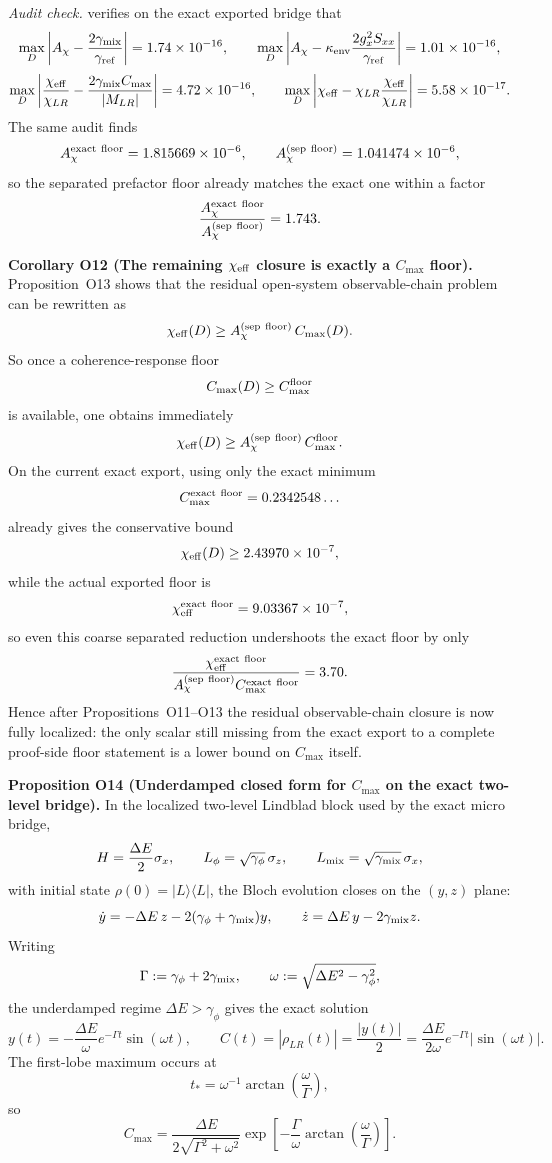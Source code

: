 \documentclass[aps,prd,onecolumn,notitlepage,nofootinbib,superscriptaddress,11pt,floatfix]{revtex4-2}
\begin{document}
\textit{Audit check.}  verifies on the exact exported bridge that
\[
\max_D\left|A_\chi-\frac{2\gamma_{\rm mix}}{\gamma_{\rm ref}}\right|=1.74\times10^{-16},
\qquad
\max_D\left|A_\chi-\kappa_{\rm env}\frac{2g_x^2S_{xx}}{\gamma_{\rm ref}}\right|=1.01\times10^{-16},
\]
\[
\max_D\left|\frac{\chi_{\rm eff}}{\chi_{LR}}-\frac{2\gamma_{\rm mix}C_{\max}}{|M_{LR}|}\right|
=4.72\times10^{-16},
\qquad
\max_D\left|\chi_{\rm eff}-\chi_{LR}\frac{\chi_{\rm eff}}{\chi_{LR}}\right|
=5.58\times10^{-17}.
\]
The same audit finds
\[
A_\chi^{\rm exact\ floor}=1.815669\times10^{-6},
\qquad
A_\chi^{\rm(sep\ floor)}=1.041474\times10^{-6},
\]
so the separated prefactor floor already matches the exact one within a factor
\[
\frac{A_\chi^{\rm exact\ floor}}{A_\chi^{\rm(sep\ floor)}}=1.743.
\]

\medskip\noindent\textbf{Corollary O12 (The remaining \texorpdfstring{$\chi_{\rm eff}$}{chi_eff} closure is exactly a \texorpdfstring{$C_{\max}$}{Cmax} floor).}
Proposition~O13 shows that the residual open-system observable-chain problem can be rewritten as
\[
\chi_{\rm eff}(D)\ge A_\chi^{\rm(sep\ floor)}\,C_{\max}(D).
\]
So once a coherence-response floor
\[
C_{\max}(D)\ge C_{\max}^{\rm floor}
\]
is available, one obtains immediately
\[
\chi_{\rm eff}(D)\ge A_\chi^{\rm(sep\ floor)}\,C_{\max}^{\rm floor}.
\]
On the current exact export, using only the exact minimum
\[
C_{\max}^{\rm exact\ floor}=0.2342548\ldots
\]
already gives the conservative bound
\[
\chi_{\rm eff}(D)\ge 2.43970\times10^{-7},
\]
while the actual exported floor is
\[
\chi_{\rm eff}^{\rm exact\ floor}=9.03367\times10^{-7},
\]
so even this coarse separated reduction undershoots the exact floor by only
\[
\frac{\chi_{\rm eff}^{\rm exact\ floor}}
{A_\chi^{\rm(sep\ floor)}C_{\max}^{\rm exact\ floor}}
=3.70.
\]
Hence after Propositions~O11--O13 the residual observable-chain closure is now fully localized: the only scalar still missing from the exact export to a complete proof-side floor statement is a lower bound on $C_{\max}$ itself.

\medskip\noindent\textbf{Proposition O14 (Underdamped closed form for \texorpdfstring{$C_{\max}$}{Cmax} on the exact two-level bridge).}
In the localized two-level Lindblad block used by the exact micro bridge,
\[
H=\frac{\Delta E}{2}\sigma_x,
\qquad
L_\phi=\sqrt{\gamma_\phi}\,\sigma_z,
\qquad
L_{\rm mix}=\sqrt{\gamma_{\rm mix}}\,\sigma_x,
\]
with initial state $\rho(0)=|L\rangle\langle L|$, the Bloch evolution closes on the $(y,z)$ plane:
\[
\dot y = -\Delta E\, z - 2(\gamma_\phi+\gamma_{\rm mix})y,
\qquad
\dot z = \Delta E\, y - 2\gamma_{\rm mix} z.
\]
Writing
\[
\Gamma := \gamma_\phi + 2\gamma_{\rm mix},
\qquad
\omega := \sqrt{\Delta E^2-\gamma_\phi^2},
\]
the underdamped regime $\Delta E>\gamma_\phi$ gives the exact solution
\[
y(t)=-\frac{\Delta E}{\omega}e^{-\Gamma t}\sin(\omega t),
\qquad
C(t)=|\rho_{LR}(t)|=\frac{|y(t)|}{2}
=
\frac{\Delta E}{2\omega}e^{-\Gamma t}|\sin(\omega t)|.
\]
The first-lobe maximum occurs at
\[
t_\ast = \omega^{-1}\arctan\!\left(\frac{\omega}{\Gamma}\right),
\]
so
\[
C_{\max}
=
\frac{\Delta E}{2\sqrt{\Gamma^2+\omega^2}}
\exp\!\left[
-\frac{\Gamma}{\omega}\arctan\!\left(\frac{\omega}{\Gamma}\right)
\right].
\]
\end{document}
